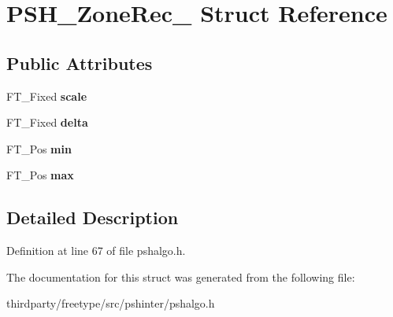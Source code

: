 \hypertarget{struct_p_s_h___zone_rec__}{}\section{P\+S\+H\+\_\+\+Zone\+Rec\+\_\+ Struct Reference}
\label{struct_p_s_h___zone_rec__}
\subsection*{Public Attributes}
\begin{DoxyCompactItemize}
\item 
\mbox{\label{struct_p_s_h___zone_rec___ab93eb10ed45acf60824a40ced702a920}} 
F\+T\+\_\+\+Fixed {\bfseries scale}
\item 
\mbox{\label{struct_p_s_h___zone_rec___adc0752fc9ceceb51a59fd25b86ba6ded}} 
F\+T\+\_\+\+Fixed {\bfseries delta}
\item 
\mbox{\label{struct_p_s_h___zone_rec___a59f0c416cf9cafe1649ec79d0f705ba8}} 
F\+T\+\_\+\+Pos {\bfseries min}
\item 
\mbox{\label{struct_p_s_h___zone_rec___a0e7356897012e58fae815290c2363978}} 
F\+T\+\_\+\+Pos {\bfseries max}
\end{DoxyCompactItemize}


\subsection{Detailed Description}


Definition at line 67 of file pshalgo.\+h.



The documentation for this struct was generated from the following file\+:\begin{DoxyCompactItemize}
\item 
thirdparty/freetype/src/pshinter/pshalgo.\+h\end{DoxyCompactItemize}
